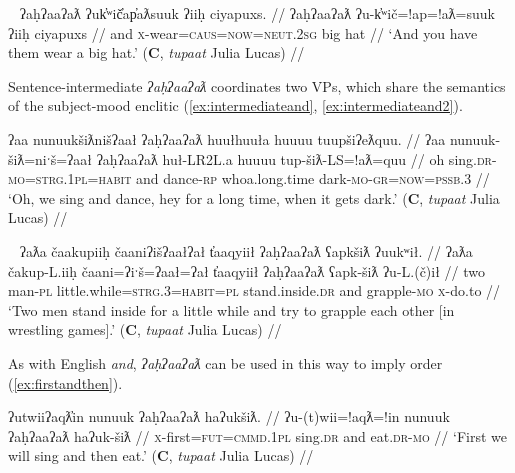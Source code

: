 \ex~ \label{ex:sentinitandnoclitics}
\begingl
\glpreamble ʔaḥʔaaʔaƛ ʔuk̓ʷič̓ap̓aƛsuuk ʔiiḥ ciyapuxs. //
\gla ʔaḥʔaaʔaƛ ʔu-k̓ʷič=!ap=!aƛ=suuk ʔiiḥ ciyapuxs //
\glb and \textsc{x}-wear=\textsc{caus}=\textsc{now}=\textsc{neut.2sg} big hat //
\glft `And you have them wear a big hat.' (\textbf{C}, \textit{tupaat} Julia Lucas) //
\endgl
\xe


Sentence-intermediate \textit{ʔaḥʔaaʔaƛ} coordinates two VPs, which share the semantics of the subject-mood enclitic (\ref{ex:intermediateand}, \ref{ex:intermediateand2}).

\ex \label{ex:intermediateand}
\begingl
\glpreamble ʔaa nunuukšiƛnišʔaał ʔaḥʔaaʔaƛ huułhuuła huuuu tuupšiʔeƛquu. //
\gla ʔaa nunuuk-šiƛ=niˑš=ʔaał ʔaḥʔaaʔaƛ huł-LR2L.a huuuu tup-šiƛ-LS=!aƛ=quu //
\glb oh sing.\textsc{dr}-\textsc{mo}=\textsc{strg.1pl}=\textsc{habit} and dance-\textsc{rp} whoa.long.time dark-\textsc{mo}-\textsc{gr}=\textsc{now}=\textsc{pssb.3} //
\glft `Oh, we sing and dance, hey for a long time, when it gets dark.' (\textbf{C}, \textit{tupaat} Julia Lucas) //
\endgl
\xe


\ex~ \label{ex:intermediateand2}
\begingl
\glpreamble ʔaƛa čaakupiiḥ čaaniʔišʔaałʔał t̓aaqyiił ʔaḥʔaaʔaƛ ʕapkšiƛ ʔuukʷił. //
\gla ʔaƛa čakup-L.iiḥ čaani=ʔiˑš=ʔaał=ʔał t̓aaqyiił ʔaḥʔaaʔaƛ ʕapk-šiƛ ʔu-L.(č)ił //
\glb two man-\textsc{pl} little.while=\textsc{strg.3}=\textsc{habit}=\textsc{pl} stand.inside.\textsc{dr} and grapple-\textsc{mo} \textsc{x}-do.to //
\glft `Two men stand inside for a little while and try to grapple each other [in wrestling games].' (\textbf{C}, \textit{tupaat} Julia Lucas) //
\endgl
\xe

As with English \textit{and}, \textit{ʔaḥʔaaʔaƛ} can be used in this way to imply order (\ref{ex:firstandthen}).

\ex \label{ex:firstandthen}
\begingl
\glpreamble ʔutwiiʔaqƛ̓in nunuuk ʔaḥʔaaʔaƛ haʔukšiƛ. //
\gla ʔu-(t)wii=!aqƛ=!in nunuuk ʔaḥʔaaʔaƛ haʔuk-šiƛ //
\glb \textsc{x}-first=\textsc{fut}=\textsc{cmmd.1pl} sing.\textsc{dr} and eat.\textsc{dr}-\textsc{mo} //
\glft `First we will sing and then eat.' (\textbf{C}, \textit{tupaat} Julia Lucas) //
\endgl
\xe

